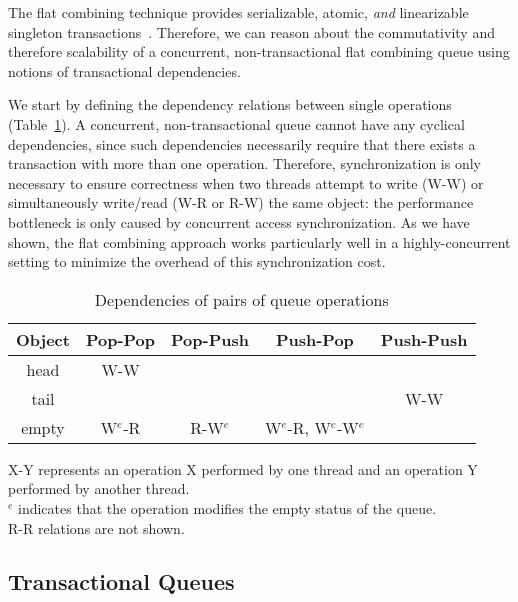 The flat combining technique provides serializable, atomic, \emph{and} linearizable singleton transactions~\cite{flatcombining}. Therefore, we can reason about the commutativity and therefore scalability of a concurrent, non-transactional flat combining queue using notions of transactional dependencies.

We start by defining the dependency relations between single operations (Table~\ref{table:queuesimpledeps}). A concurrent, non-transactional queue cannot have any cyclical dependencies, since such dependencies necessarily require that there exists a transaction with more than one operation. Therefore, synchronization is only necessary to ensure correctness when two threads attempt to write (W-W) or simultaneously write/read (W-R or R-W) the same object: the performance bottleneck is only caused by concurrent access synchronization. As we have shown, the flat combining approach works particularly well in a highly-concurrent setting to minimize the overhead of this synchronization cost.

\begin{table}[t]
    \centering
\begin{tabular}{c||c|c|c|c}
    Object & Pop-Pop & Pop-Push & Push-Pop & Push-Push\\
    \hline
    head & W-W & & & \\
    tail & & & & W-W\\
    empty & W$^e$-R & R-W$^e$ & W$^e$-R, W$^e$-W$^e$ & \\
\end{tabular}
    \caption*{X-Y represents an operation X performed by one thread and an operation Y performed by another thread.\\$^e$ indicates that the operation modifies the empty status of the queue.\\R-R relations are not shown.}
    \caption{Dependencies of pairs of queue operations}
    \label{table:queuesimpledeps}
\end{table}

\subsection{Transactional Queues}

